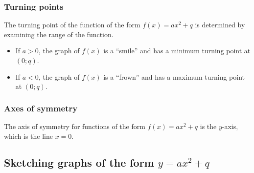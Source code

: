 \subsubsection*{Turning points}

The turning point of the function of the form $f(x)=ax^{2}+q$ is determined by examining the range of the function. 
\begin{itemize}
 \item If $a>0$, the graph of $f(x)$ is a ``smile'' and has a minimum turning point at $(0;q)$.
\item If $a<0$, the graph of $f(x)$ is a ``frown'' and has a maximum turning point at $(0;q)$.
\end{itemize}


\subsubsection*{Axes of symmetry}

The axis of symmetry for functions of the form $f(x)=ax^{2}+q$ is the $y$-axis, which is the line $x=0$. 

\subsection*{Sketching graphs of the form $y=ax^{2}+q$}

